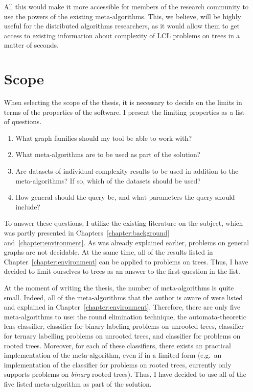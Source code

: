 All this would make it more accessible for members of the research
community to use the powers of the existing meta-algorithms.
This, we believe, will be highly useful for the distributed
algorithms researchers, as it would allow them to get access
to existing information about complexity of LCL problems on trees
in a matter of seconds.

\section{Scope}

When selecting the scope of the thesis, it is necessary
to decide on the limits
in terms of the properties of the software. I present the limiting properties
as a list of questions.

\begin{enumerate}
  \item What graph families should my tool be able to work with?
  \item What meta-algorithms are to be used as part of the solution?
  \item Are datasets of individual complexity results to be used
  in addition to the meta-algorithms? If so, which of the datasets should be used?
  \item How general should the query be, and what parameters the query should include?
\end{enumerate}

To answer these questions, I utilize the existing literature on the subject, which was partly presented in Chapters~\ref{chapter:background} and~\ref{chapter:environment}. As was already explained earlier, problems on general graphs are not decidable. At the same time, all of the results listed in Chapter~\ref{chapter:environment} can be applied to problems on trees. Thus,
I have decided to limit ourselves to trees as an answer to the first question in the list.

At the moment of writing the thesis, the number of meta-algorithms is
quite small. Indeed, all of the meta-algorithms that the author is aware of were listed and explained in Chapter~\ref{chapter:environment}. Therefore, there are only five meta-algorithms to use: the round elimination technique, the automata-theoretic lens classifier, classifier for binary labeling problems on unrooted trees, classifier for ternary labelling problems on unrooted trees, and classifier for problems on rooted trees. Moreover, for each of these classifiers, there exists an practical implementation of the meta-algorithm, even if in a limited form (e.g.\ an implementation of the classifier for problems on rooted trees, currently only supports problems on \emph{binary} rooted trees). Thus, I have decided to use all of the five listed meta-algorithm as part of the solution.

